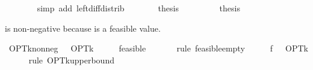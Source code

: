 \begin{isabellebody}
\ \ \ \ \ \ \isamarkupfalse%
\ {\isacharparenleft}{\kern0pt}simp\ add{\isacharcolon}{\kern0pt}\ left{\isacharunderscore}{\kern0pt}diff{\isacharunderscore}{\kern0pt}distrib{\isacharparenright}{\kern0pt}\isanewline
\ \ \ \ \isamarkupfalse%
\ \isamarkupfalse%
\ {\isacharquery}{\kern0pt}thesis\ \isakeywordONE{{\isachardot}{\kern0pt}}\isamarkupfalse%
\isanewline
\ \ \isamarkupfalse%
\isanewline
\isanewline
\ \ \isamarkupfalse%
\ \isamarkupfalse%
\ {\isacharquery}{\kern0pt}thesis\ \isakeywordONE{{\isachardot}{\kern0pt}}\isamarkupfalse%
\isanewline
{}\isamarkupfalse%
%
\endisatagproof
{\isafoldproof}%
%
\isadelimproof
%
\endisadelimproof
%
\isadelimdocument
%
\endisadelimdocument
%
\isatagdocument
%
\isamarkuptrue%
%
\endisatagdocument
{\isafolddocument}%
%
\isadelimdocument
%
\endisadelimdocument
%
\begin{isamarkuptext}%
 is non-negative because  is a feasible value.%
\end{isamarkuptext}\isamarkuptrue%
\isamarkupfalse%
\ OPT{\isacharunderscore}{\kern0pt}k{\isacharunderscore}{\kern0pt}nonneg{\isacharcolon}{\kern0pt}\ {\isachardoublequoteopen}{}\ {\isasymle}\ OPT{\isacharunderscore}{\kern0pt}k{\isachardoublequoteclose}\isanewline
%
\isadelimproof
%
\endisadelimproof
%
\isatagproof
{}\isamarkupfalse%
\ {\isacharminus}{\kern0pt}\isanewline
\ \ \isamarkupfalse%
\ {\isachardoublequoteopen}feasible\ {\isacharbraceleft}{\kern0pt}{\isacharbraceright}{\kern0pt}{\isachardoublequoteclose}\isanewline
\ \ \ \ \isamarkupfalse%
\ {\isacharparenleft}{\kern0pt}rule\ feasible{\isacharunderscore}{\kern0pt}empty{\isacharparenright}{\kern0pt}\isanewline
\ \ \isamarkupfalse%
\ \isamarkupfalse%
\ {\isachardoublequoteopen}f\ {\isacharbraceleft}{\kern0pt}{\isacharbraceright}{\kern0pt}\ {\isasymle}\ OPT{\isacharunderscore}{\kern0pt}k{\isachardoublequoteclose}\isanewline
\ \ \ \ \isamarkupfalse%
\ {\isacharparenleft}{\kern0pt}rule\ OPT{\isacharunderscore}{\kern0pt}k{\isacharunderscore}{\kern0pt}upper{\isacharunderscore}{\kern0pt}bound{\isacharparenright}{\kern0pt}\isanewline
\ \ \isamarkupfalse%

\end{isabellebody}
